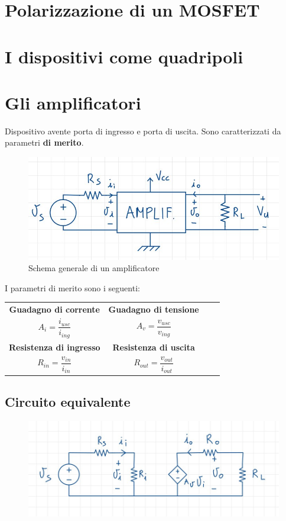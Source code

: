 \documentclass[11pt,a4paper,]{article}
\begin{document}
\section{Polarizzazione di un MOSFET}

\section{I dispositivi come quadripoli}

\section{Gli amplificatori}
\begin{definizione}
    [Amplificatore]
    Dispositivo avente porta di ingresso e porta di uscita. Sono caratterizzati da parametri \textbf{di merito}.
    \begin{figure}[H]
        \centering
        \includegraphics[width=0.5\linewidth]{img/amp.png}
        \caption{Schema generale di un amplificatore}
    \end{figure}
    I parametri di merito sono i seguenti:
    \begin{table}[H]
        \centering
        \begin{tabular}{cccc}
        \textbf{Guadagno di corrente} & \textbf{Guadagno di tensione} \\
        $A_i = \dfrac{i_{usc}}{i_{ing}}$ & $A_v = \dfrac{v_{usc}}{v_{ing}}$\\ 
         \textbf{Resistenza di ingresso} & \textbf{Resistenza di uscita} \\
         $R_{in} = \dfrac{v_{in}}{i_{in}}$ & $R_{out} = \dfrac{v_{out}}{i_{out}}$
        \end{tabular}
    \end{table}
\end{definizione}
\subsection{Circuito equivalente}
\begin{figure}[H]
    \centering
    \includegraphics[width=0.5\linewidth]{img/amp circ eq.png}
\end{figure}
\end{document}
